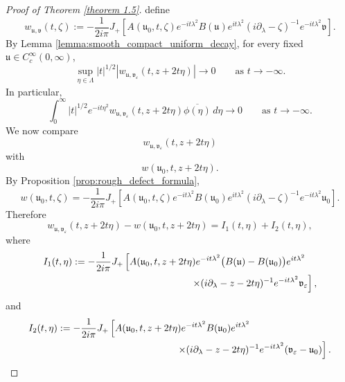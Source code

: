 \documentclass[10pt]{article}
\numberwithin{equation}{section}
\numberwithin{theorem}{section}
\begin{document}
\begin{proof}[Proof of Theorem \ref{theorem 1.5}]
define
\begin{equation}
\label{eq:thm15-smooth-w-def}
w_{\mathfrak u,\mathfrak v}(t,\zeta)
:=
-\frac1{2i\pi}
J_+\left[
A(\mathfrak u_0,t,\zeta)e^{-it\lambda^2}
B(\mathfrak u)e^{it\lambda^2}
(i\partial_\lambda-\zeta)^{-1}
e^{-it\lambda^2}\mathfrak v
\right].
\end{equation}
By Lemma \ref{lemma:smooth_compact_uniform_decay}, for every fixed
\(\mathfrak u\in C_c^\infty(0,\infty)\),
\begin{equation}
\label{eq:thm15-smooth-decay}
\sup_{\eta\in\Lambda}
|t|^{1/2}
\left|
w_{\mathfrak u,\mathfrak v_\varepsilon}(t,z+2t\eta)
\right|
\longrightarrow0
\qquad\text{as }t\to-\infty.
\end{equation}
In particular,
\begin{equation}
\label{eq:thm15-smooth-test-decay}
\int_0^\infty
|t|^{1/2}e^{-it\eta^2}
w_{\mathfrak u,\mathfrak v_\varepsilon}(t,z+2t\eta)
\overline{\phi(\eta)}\,d\eta
\longrightarrow0 \qquad\text{as }t\to-\infty.
\end{equation}
We now compare
\[
w_{\mathfrak u,\mathfrak v_\varepsilon}(t,z+2t\eta)
\]
with
\[
w(\mathfrak u_0,t,z+2t\eta).
\]
By Proposition \ref{prop:rough_defect_formula},
\begin{equation}
\label{eq:thm15-rough-defect-formula}
w(\mathfrak u_0,t,\zeta)
=
-\frac1{2i\pi}
J_+\left[
A(\mathfrak u_0,t,\zeta)e^{-it\lambda^2}
B(\mathfrak u_0)e^{it\lambda^2}
(i\partial_\lambda-\zeta)^{-1}
e^{-it\lambda^2}\mathfrak u_0
\right].
\end{equation}
Therefore
\begin{equation}
\label{eq:thm15-difference-split}
w_{\mathfrak u,\mathfrak v_\varepsilon}(t,z+2t\eta)
-
w(\mathfrak u_0,t,z+2t\eta)
=
I_1(t,\eta)+I_2(t,\eta),
\end{equation}
where
\begin{equation}
\label{eq:thm15-I1-def}
\begin{aligned}
I_1(t,\eta)
&:=
-\frac1{2i\pi}
J_+\left[
A(\mathfrak u_0,t,z+2t\eta)e^{-it\lambda^2}
\bigl(B(\mathfrak u)-B(\mathfrak u_0)\bigr)e^{it\lambda^2}
\right. \\
&\hspace{4.3cm}\left.
\times
(i\partial_\lambda-z-2t\eta)^{-1}
e^{-it\lambda^2}\mathfrak v_\varepsilon
\right],
\end{aligned}
\end{equation}
and
\begin{equation}
\label{eq:thm15-I2-def}
\begin{aligned}
I_2(t,\eta)
&:=
-\frac1{2i\pi}
J_+\left[
A(\mathfrak u_0,t,z+2t\eta)e^{-it\lambda^2}
B(\mathfrak u_0)e^{it\lambda^2}
\right.\\
&\hspace{4.3cm}\left.
\times
(i\partial_\lambda-z-2t\eta)^{-1}
e^{-it\lambda^2}
(\mathfrak v_\varepsilon-\mathfrak u_0)
\right].
\end{aligned}
\end{equation}


\end{proof}
\end{document}
